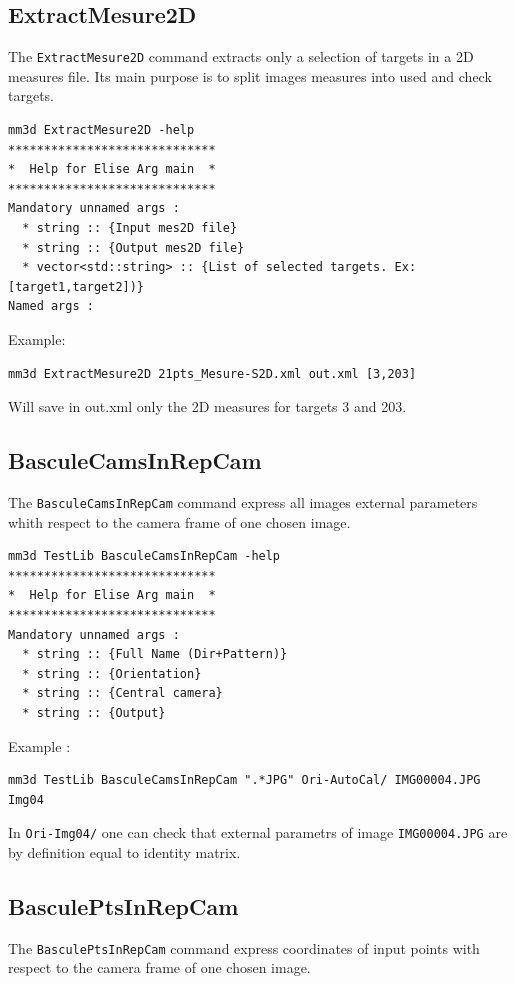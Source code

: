 \subsection{ExtractMesure2D}
The {\tt ExtractMesure2D} command extracts only a selection of targets in a 2D measures file. Its main purpose is to split images measures into used and check targets.

\begin{verbatim}
mm3d ExtractMesure2D -help
*****************************
*  Help for Elise Arg main  *
*****************************
Mandatory unnamed args : 
  * string :: {Input mes2D file}
  * string :: {Output mes2D file}
  * vector<std::string> :: {List of selected targets. Ex: [target1,target2])}
Named args : 
\end{verbatim}

Example:
\begin{verbatim}
mm3d ExtractMesure2D 21pts_Mesure-S2D.xml out.xml [3,203]
\end{verbatim}
Will save in out.xml only the 2D measures for targets 3 and 203.

\subsection{BasculeCamsInRepCam}
The {\tt BasculeCamsInRepCam} command express all images external parameters whith respect to the camera frame of one chosen image.

\begin{verbatim}
mm3d TestLib BasculeCamsInRepCam -help
*****************************
*  Help for Elise Arg main  *
*****************************
Mandatory unnamed args : 
  * string :: {Full Name (Dir+Pattern)}
  * string :: {Orientation}
  * string :: {Central camera}
  * string :: {Output}
\end{verbatim}

Example :
\begin{verbatim}
mm3d TestLib BasculeCamsInRepCam ".*JPG" Ori-AutoCal/ IMG00004.JPG Img04
\end{verbatim}

In {\tt Ori-Img04/} one can check that external parametrs of image {\tt IMG00004.JPG} are by definition equal to identity matrix.

\subsection{BasculePtsInRepCam}
The {\tt BasculePtsInRepCam} command express coordinates of input points with respect to the camera frame of one chosen image.

